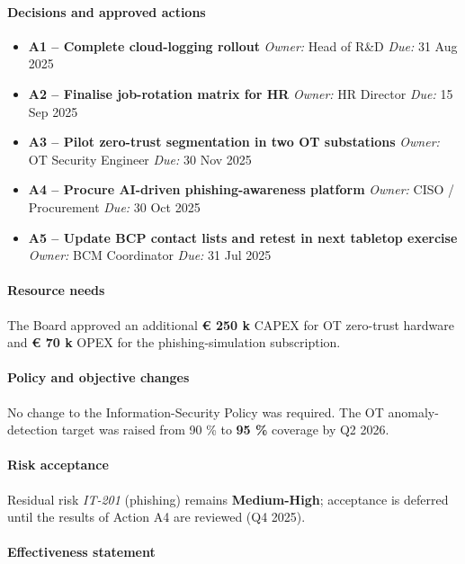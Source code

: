 \paragraph{Decisions and approved actions}
\begin{itemize}
  \item \textbf{A1 – Complete cloud-logging rollout}  
        \emph{Owner:} Head of R\&D \quad \emph{Due:} 31 Aug 2025
  \item \textbf{A2 – Finalise job-rotation matrix for HR}  
        \emph{Owner:} HR Director \quad \emph{Due:} 15 Sep 2025
  \item \textbf{A3 – Pilot zero-trust segmentation in two OT substations}  
        \emph{Owner:} OT Security Engineer \quad \emph{Due:} 30 Nov 2025
  \item \textbf{A4 – Procure AI-driven phishing-awareness platform}  
        \emph{Owner:} CISO / Procurement \quad \emph{Due:} 30 Oct 2025
  \item \textbf{A5 – Update BCP contact lists and retest in next
        tabletop exercise}  
        \emph{Owner:} BCM Coordinator \quad \emph{Due:} 31 Jul 2025
\end{itemize}

\paragraph{Resource needs}

The Board approved an additional \textbf{€ 250 k} CAPEX for OT
zero-trust hardware and \textbf{€ 70 k} OPEX for the phishing-simulation
subscription.

\paragraph{Policy and objective changes}

No change to the Information-Security Policy was required.  
The OT anomaly-detection target was raised from 90 \% to
\textbf{95 \%} coverage by Q2 2026.

\paragraph{Risk acceptance}

Residual risk \emph{IT-201} (phishing) remains \textbf{Medium-High};
acceptance is deferred until the results of Action A4 are reviewed
(Q4 2025).

\paragraph{Effectiveness statement}

